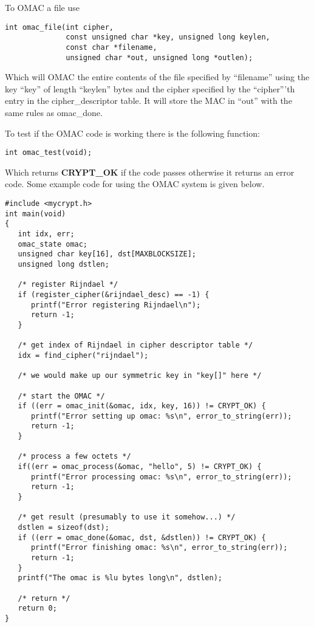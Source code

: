 \documentclass[b5paper]{book}
\begin{document}
To OMAC a file use
\begin{verbatim}
int omac_file(int cipher, 
              const unsigned char *key, unsigned long keylen,
              const char *filename, 
              unsigned char *out, unsigned long *outlen);
\end{verbatim}

Which will OMAC the entire contents of the file specified by ``filename'' using the key ``key'' of length ``keylen'' bytes
and the cipher specified by the ``cipher'''th entry in the cipher\_descriptor table.  It will store the MAC in ``out'' with 
the same rules as omac\_done.

To test if the OMAC code is working there is the following function:
\begin{verbatim}
int omac_test(void);
\end{verbatim}
Which returns {\bf CRYPT\_OK} if the code passes otherwise it returns an error code.  Some example code for using the 
OMAC system is given below.

\begin{small}
\begin{verbatim}
#include <mycrypt.h>
int main(void)
{
   int idx, err;
   omac_state omac;
   unsigned char key[16], dst[MAXBLOCKSIZE];
   unsigned long dstlen;

   /* register Rijndael */
   if (register_cipher(&rijndael_desc) == -1) {
      printf("Error registering Rijndael\n");
      return -1;
   }

   /* get index of Rijndael in cipher descriptor table */
   idx = find_cipher("rijndael");

   /* we would make up our symmetric key in "key[]" here */

   /* start the OMAC */
   if ((err = omac_init(&omac, idx, key, 16)) != CRYPT_OK) {
      printf("Error setting up omac: %s\n", error_to_string(err));
      return -1;
   }

   /* process a few octets */
   if((err = omac_process(&omac, "hello", 5) != CRYPT_OK) {
      printf("Error processing omac: %s\n", error_to_string(err));
      return -1;
   }

   /* get result (presumably to use it somehow...) */
   dstlen = sizeof(dst);
   if ((err = omac_done(&omac, dst, &dstlen)) != CRYPT_OK) {
      printf("Error finishing omac: %s\n", error_to_string(err));
      return -1;
   }
   printf("The omac is %lu bytes long\n", dstlen);
  
   /* return */
   return 0;
}
\end{verbatim}
\end{small}
\end{document}
